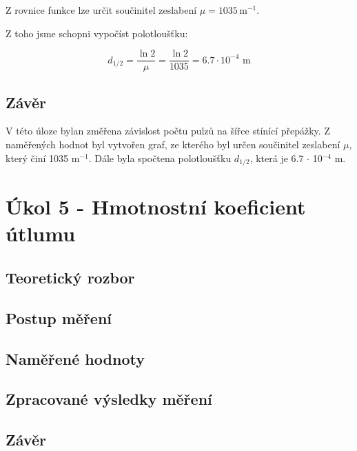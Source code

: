 \documentclass{protokol}
\begin{document}
    
    \begin{flushleft}
    Z rovnice funkce lze určit součinitel zeslabení $\mu = 1035 \, \text{m}^{-1}$.
    \end{flushleft}
    
    \begin{flushleft}
        Z toho jsme schopni vypočíst polotloušťku:
    \end{flushleft}

        \begin{equation}
        d_{1/2} =  \dfrac{\ln{2}}{\mu} = \dfrac{\ln{2}}{1035} = 6.7 \cdot 10^{-4} \text{ m}
        \end{equation}
    


    \subsection{Závěr}

    V této úloze bylan změřena závislost počtu pulzů na šířce stínící přepážky. Z naměřených hodnot byl vytvořen graf, ze kterého byl určen součinitel zeslabení $\mu$, který činí 1035 m$^{-1}$. Dále byla spočtena polotloušťku $d_{1/2}$, která je 6.7 $\cdot$ 10$^{-4}$ m.

\pagebreak

\section{Úkol 5 - Hmotnostní koeficient útlumu}
    \subsection{Teoretický rozbor}
    \subsection{Postup měření}
    \subsection{Naměřené hodnoty}   
    \subsection{Zpracované výsledky měření}
    \subsection{Závěr}
\end{document}
